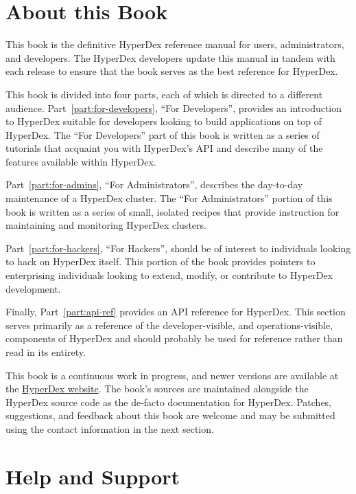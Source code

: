 \section{About this Book}
\label{sec:introduction:about}

This book is the definitive HyperDex reference manual for users, administrators,
and developers.  The HyperDex developers update this manual in tandem with each
release to ensure that the book serves as the best reference for HyperDex.

This book is divided into four parts, each of which is directed to a different
audience.  Part~\ref{part:for-developers}, ``For Developers'', provides an
introduction to HyperDex suitable for developers looking to build applications
on top of HyperDex.  The ``For Developers'' part of this book is written as a
series of tutorials that acquaint you with HyperDex's API and describe many of
the features available within HyperDex.

Part~\ref{part:for-admins}, ``For Administrators'', describes the day-to-day
maintenance of a HyperDex cluster.  The ``For Administrators'' portion of this
book is written as a series of small, isolated recipes that provide instruction
for maintaining and monitoring HyperDex clusters.

Part~\ref{part:for-hackers}, ``For Hackers'', should be of interest to
individuals looking to hack on HyperDex itself.  This portion of the book
provides pointers to enterprising individuals looking to extend, modify, or
contribute to HyperDex development.

Finally, Part~\ref{part:api-ref} provides an API reference for HyperDex.  This
section serves primarily as a reference of the developer-visible, and
operations-visible, components of HyperDex and should probably be used for
reference rather than read in its entirety.

This book is a continuous work in progress, and newer versions are available at
the \href{http://hyperdex.org/}{HyperDex website}.  The book's sources are
maintained alongside the HyperDex source code as the de-facto documentation for
HyperDex.  Patches, suggestions, and feedback about this book are welcome and
may be submitted using the contact information in the next section.

\section{Help and Support}
\label{sec:introduction:support}

